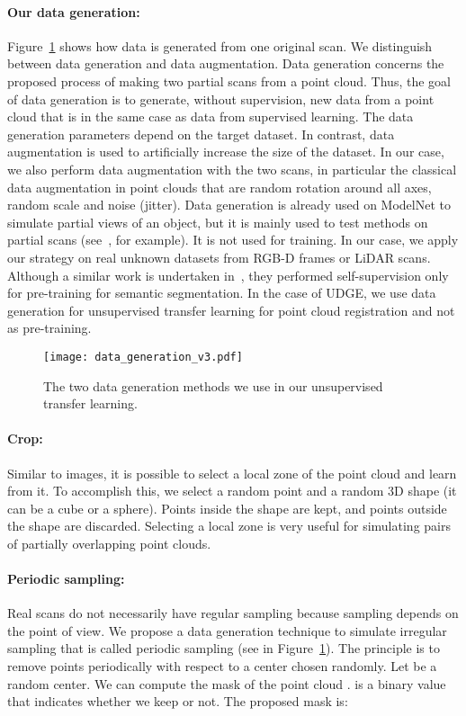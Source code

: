 \documentclass[10pt,twocolumn,letterpaper]{article}
\begin{document}
\paragraph{Our data generation:}
Figure~\ref{fig:pipeline} shows how data is generated from one original scan. We distinguish between data generation and data augmentation. Data generation concerns the proposed process of making two partial scans from a point cloud. Thus, the goal of data generation is to generate, without supervision, new data from a point cloud that is in the same case as data from supervised learning. 
The data generation parameters depend on the target dataset. In contrast, data augmentation is used to artificially increase the size of the dataset. In our case, we also perform data augmentation with the two scans, in particular the classical data augmentation in point clouds that are random rotation around all axes, random scale and noise (jitter).
Data generation is already used on ModelNet to simulate partial views of an object, but it is mainly used to test methods on partial scans (see~\cite{yew2020rpmnet}, for example). It is not used for training. In our case, we apply our strategy on real unknown datasets from RGB-D frames or LiDAR scans. 
Although a similar work is undertaken in~\cite{zhang_depth_contrast}, they performed
self-supervision only for pre-training for semantic segmentation.
In the case of UDGE, we use data generation for unsupervised transfer learning for point cloud registration and not as pre-training.

\begin{figure}
    \centering
    \texttt{[image: data\_generation\_v3.pdf]}
    \caption{The two data generation methods we use in our unsupervised transfer learning.}
    \label{fig:pipeline}
\end{figure}

\paragraph{Crop:}
Similar to images, it is possible to select a local zone of the point cloud and learn from it.
To accomplish this, we select a random point and a random 3D shape (it can be a cube or a sphere). Points inside the shape are kept, and points outside the shape are discarded. Selecting a local zone is very useful for simulating pairs of partially overlapping point clouds.



\paragraph{Periodic sampling:}
Real scans do not necessarily have regular sampling because sampling depends on the point of view. We propose a data generation technique to simulate irregular sampling that is called periodic sampling (see in Figure~\ref{fig:pipeline}). The principle is to remove points periodically with respect to a center chosen randomly.
Let   be a random center. We can compute the mask of the point cloud .  is a binary value that indicates whether we keep  or not. The proposed mask is:
\end{document}
